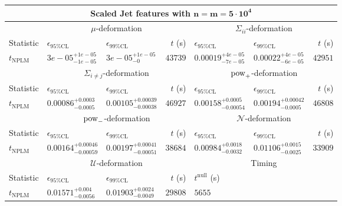 \begin{tabular}{l|llr|llr}
	\toprule
	\multicolumn{7}{c}{{\bf Scaled Jet features with $\mathbf{n=m=5\cdot 10^{4}}$}} \\
	\toprule
	\multicolumn{1}{c}{} & \multicolumn{3}{c}{$\mu$-deformation} & \multicolumn{3}{c}{$\Sigma_{ii}$-deformation} \\
	Statistic & $\epsilon_{95\%\mathrm{CL}}$ & $\epsilon_{99\%\mathrm{CL}}$ & $t$ (s) & $\epsilon_{95\%\mathrm{CL}}$ & $\epsilon_{99\%\mathrm{CL}}$ & $t$ (s) \\
	\midrule
	$t_{\mathrm{NPLM}}$ & $3e-05_{-1e-05}^{+1e-05}$ & $3e-05_{-0}^{+1e-05}$ & $43739$ & $0.00019_{-7e-05}^{+4e-05}$ & $0.00022_{-6e-05}^{+4e-05}$ & $42951$ \\
	\toprule
	\multicolumn{1}{c}{} & \multicolumn{3}{c}{$\Sigma_{i\neq j}$-deformation} & \multicolumn{3}{c}{$\rm{pow}_{+}$-deformation} \\
	Statistic & $\epsilon_{95\%\mathrm{CL}}$ & $\epsilon_{99\%\mathrm{CL}}$ & $t$ (s) & $\epsilon_{95\%\mathrm{CL}}$ & $\epsilon_{99\%\mathrm{CL}}$ & $t$ (s) \\
	\midrule
	$t_{\mathrm{NPLM}}$ & $0.00086_{-0.0005}^{+0.0003}$ & $0.00105_{-0.00038}^{+0.00039}$ & $46927$ & $0.00158_{-0.00054}^{+0.0005}$ & $0.00194_{-0.0005}^{+0.00042}$ & $46808$ \\
	\toprule
	\multicolumn{1}{c}{} & \multicolumn{3}{c}{$\rm{pow}_{-}$-deformation} & \multicolumn{3}{c}{$\mathcal{N}$-deformation} \\
	Statistic & $\epsilon_{95\%\mathrm{CL}}$ & $\epsilon_{99\%\mathrm{CL}}$ & $t$ (s) & $\epsilon_{95\%\mathrm{CL}}$ & $\epsilon_{99\%\mathrm{CL}}$ & $t$ (s) \\
	\midrule
	$t_{\mathrm{NPLM}}$ & $0.00164_{-0.00059}^{+0.00046}$ & $0.00197_{-0.00051}^{+0.00041}$ & $38684$ & $0.00984_{-0.0032}^{+0.0018}$ & $0.01106_{-0.0025}^{+0.0015}$ & $33909$ \\
	\toprule
	\multicolumn{1}{c}{} & \multicolumn{3}{c}{$\mathcal{U}$-deformation} & \multicolumn{3}{c}{Timing} \\
	Statistic & $\epsilon_{95\%\mathrm{CL}}$ & $\epsilon_{99\%\mathrm{CL}}$ & $t$ (s) & $t^{\mathrm{null}}$ (s) \\
	\midrule
	$t_{\mathrm{NPLM}}$ & $0.01571_{-0.0056}^{+0.004}$ & $0.01903_{-0.0049}^{+0.0024}$ & $29808$ & $5655$ \\
	\bottomrule
\end{tabular}